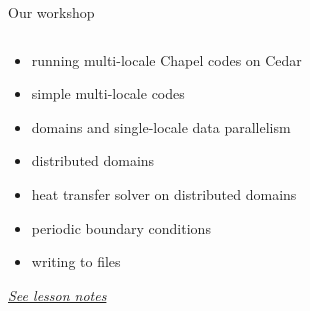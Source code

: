 \documentclass[10pt,xcolor=pdftex,dvipsnames,table]{beamer}
\newcommand{\tc}{\textcolor}
\begin{document}
\begin{frame}{Our workshop}
\begin{columns}[]
\begin{block}{}
      {\let\normalsize\footnotesize \normalsize
        \begin{itemize}\setlength{\itemsep}{1mm}
        \item running multi-locale Chapel codes on Cedar
        \item simple multi-locale codes
        \item domains and single-locale data parallelism
        \item distributed domains
        \item heat transfer solver on distributed domains
        \item periodic boundary conditions
        \item writing to files
        \end{itemize}}
      \begin{center}
        \href{http://bit.ly/2CC8MLW}{\tc{Mahogany}{\it See lesson notes}}
      \end{center}
    \end{block}
  \end{columns}
\end{frame}
\end{document}
